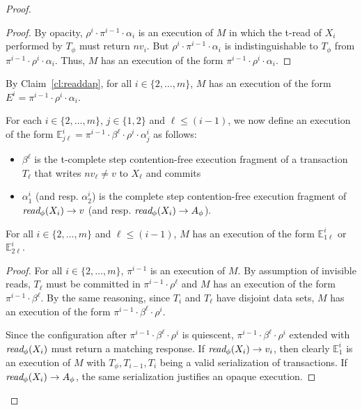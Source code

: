 \begin{proof}
\begin{proof}
By opacity, $\rho^i\cdot \pi^{i-1} \cdot \alpha_i$ is an execution
of $M$ in which the t-read of $X_i$ performed by $T_{\phi}$ must return $nv_i$.
But $\rho^i \cdot \pi^{i-1} \cdot \alpha_i$ is indistinguishable to $T_{\phi}$ from
$\pi^{i-1}\cdot \rho^i \cdot \alpha_i$.
Thus, $M$ has an execution of the form $\pi^{i-1}\cdot \rho^i \cdot \alpha_i$.
\end{proof}
%
By Claim~\ref{cl:readdap}, for all $i\in \{2,\ldots, m\}$, $M$ has an execution of the form 
$E^{i}=\pi^{i-1}\cdot \rho^i \cdot \alpha_i$.

For each $i\in \{2,\ldots, m\}$, $j\in \{1,2\}$ and $\ell \leq (i-1)$, 
we now define an execution of the form  $\mathbb{E}_{j\ell}^{i}=\pi^{i-1}\cdot \beta^{\ell}\cdot \rho^i \cdot \alpha_j^i$
as follows:
%
\begin{itemize}
\item
$\beta^{\ell}$ is the t-complete step contention-free execution fragment of a transaction $T_{\ell}$
that writes $nv_{\ell}\neq v$ to $X_{\ell}$ and commits
\item
$\alpha_1^i$ (and resp. $\alpha_2^i$) is the complete step contention-free execution fragment of 
$\textit{read}_{\phi}(X_i) \rightarrow v$ (and resp. $\textit{read}_{\phi}(X_i) \rightarrow A_{\phi}$).
\end{itemize}
%
\begin{claim}
\label{cl:ic2}
For all $i\in \{2,\ldots, m\}$ and $\ell \leq (i-1)$, $M$ has an execution of the form $\mathbb{E}_{1\ell}^{i}$ or 
$\mathbb{E}_{2\ell}^{i}$.
\end{claim}
%
\begin{proof}
%
For all $i \in \{2,\ldots, m\}$, $\pi^{i-1}$
is an execution of $M$.
By assumption of invisible reads, $T_{{\ell}}$ must be committed in $\pi^{i-1}\cdot \rho^{\ell}$
and $M$ has an execution of the form $\pi^{i-1}\cdot \beta^{\ell}$.
By the same reasoning, since $T_i$ and $T_{\ell}$ have disjoint data sets,
$M$ has an execution of the form $\pi^{i-1}\cdot\beta^{\ell}\cdot \rho^i$.

Since the configuration after $\pi^{i-1}\cdot\beta^{\ell}\cdot \rho^i$ is quiescent,
$\pi^{i-1}\cdot\beta^{\ell}\cdot \rho^i$ extended with $\textit{read}_{\phi}(X_i)$
must return a matching response.
If $\textit{read}_{\phi}(X_i) \rightarrow v_i$, then clearly $\mathbb{E}_{1}^{i}$
is an execution of $M$ with $T_{\phi}, T_{i-1}, T_i$ being a valid serialization
of transactions.
If $\textit{read}_{\phi}(X_i) \rightarrow A_{\phi}$, the same serialization
justifies an opaque execution.


\end{proof}
\end{proof}
